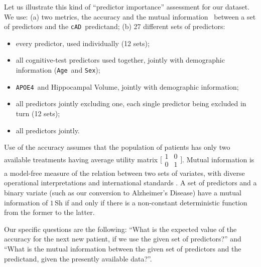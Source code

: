 \documentclass[utf8]{FrontiersinHarvard} %
\newcommand*{\wrench}{{\fontencoding{U}\fontfamily{fontawesomethree}\selectfont\symbol{114}}}
\newcommand{\mynotew}[1]{{\color{notecolour}\wrench\ #1}}
\renewcommand*{\|}[1][]{\nonscript\:#1\vert\nonscript\:\mathopen{}}
\newcommand*{\age}{\texttt{Age}}
\newcommand*{\sex}{\texttt{Sex}}
\newcommand*{\apoe}{\texttt{APOE4}}
\newcommand*{\cad}{\texttt{cAD}}
\newcommand*{\ad}{Alzheimer's Disease}
\begin{document}
Let us illustrate this kind of \enquote{predictor importance} assessment for our dataset. We use: (a) two metrics, the accuracy and the mutual information~\citep{shannon1948,coveretal1991_r2006} between a set of predictors and the \cad\ predictand; (b) 27 different sets of predictors:
\begin{itemize}
\item every predictor, used individually (12 sets);
\item all cognitive-test predictors used together, jointly with demographic information (\age\ and \sex);
\item \apoe\ and Hippocampal Volume, jointly with demographic information;
\item all predictors jointly excluding one, each single predictor being excluded in turn (12 sets);
\item all predictors jointly.
\end{itemize}

Use of the accuracy assumes that the population of patients has only two available treatments having average utility matrix $\bigl[\begin{smallmatrix}1&0\\0&1\end{smallmatrix}\bigr]$. Mutual information is a model-free measure of the relation between two sets of variates, with diverse operational interpretations \citep{mackay1995_r2005,woodward1953_r1964,minka1998d_r2003,goodetal1968,kelly1956,kullback1959_r1978} and international standards \citep{iso2008c}. A set of predictors and a binary variate (such as our conversion to \ad) have a mutual information of $1\,\mathrm{Sh}$ if and only if there is a non-constant deterministic function from the former to the latter.

Our specific questions are the following: \enquote{What is the expected value of the accuracy for the next new patient, if we use the given set of predictors?} and \enquote{What is the mutual information between the given set of predictors and the predictand, given the presently available data?}.
\end{document}
